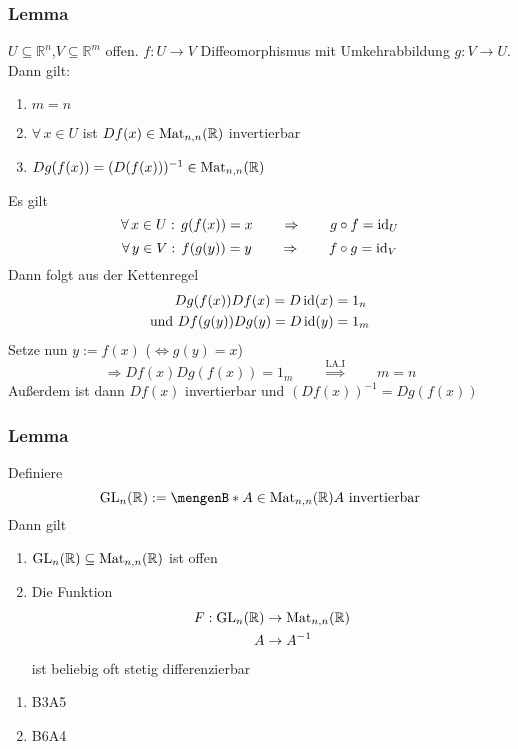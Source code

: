 \subsubsection{Lemma} %
\label{ssub:lemma}
$ U \subseteq \mathbb{R}^n$,$V \subseteq \mathbb{R}^m$ offen. $f: U \to V$ Diffeomorphismus mit Umkehrabbildung $g: V \to U$. \\
Dann gilt:
\begin{enumerate}
	\item $m=n$
	\item $\forall\, x \in U$ ist $Df(x) \in \operatorname{Mat}_{n,n}(\mathbb{R})$ invertierbar
	\item $Dg(f(x))=(D(f(x)))^{-1} \in \operatorname{Mat}_{n,n}(\mathbb{R})$
\end{enumerate}
 Es gilt
\[
	\forall\, x \in U: \,g(f(x))=x \qquad \Rightarrow \qquad g \circ f = \operatorname{id}_U
\]
\[
	\forall\, y \in V: \,f(g(y))=y \qquad \Rightarrow \qquad f \circ g = \operatorname{id}_V
\]
Dann folgt aus der Kettenregel
\begin{align*}
	Dg(f(x))Df(x)=D \operatorname{id}(x) &= 1_n \\
	\text{und }Df(g(y))Dg(y)= D \operatorname{id}(y) &= 1_m
\end{align*}
Setze nun $y:=f(x)$ ($\Leftrightarrow g(y)=x$) \\
\[
\Rightarrow Df(x)Dg(f(x))= 1_m \qquad \stackrel{\text{LA.I}}{\Rightarrow} \qquad m=n
\]
Außerdem ist dann $Df(x)$ invertierbar und $(Df(x))^{-1}=Dg(f(x))$
\bewende
\subsubsection{Lemma} %
\label{ssub:lemma}
Definiere
\[
	\GL_n(\mathbb{R}):= \set[A \in \Mat_{n,n}(\mathbb{R})]{A \text{ invertierbar}}
\]
Dann gilt
\begin{enumerate}
	\item $\operatorname{GL}_n(\mathbb{R}) \subseteq \operatorname{Mat}_{n,n}(\mathbb{R})$ ist offen
	\item Die Funktion \begin{align*}
		F: \operatorname{GL}_n(\mathbb{R}) &\to \operatorname{Mat}_{n,n}(\mathbb{R}) \\
		A &\to A^{-1} 
	\end{align*}
ist beliebig oft stetig differenzierbar
\end{enumerate}
 \begin{enumerate}
	\item B3A5
	\item B6A4
\end{enumerate}
